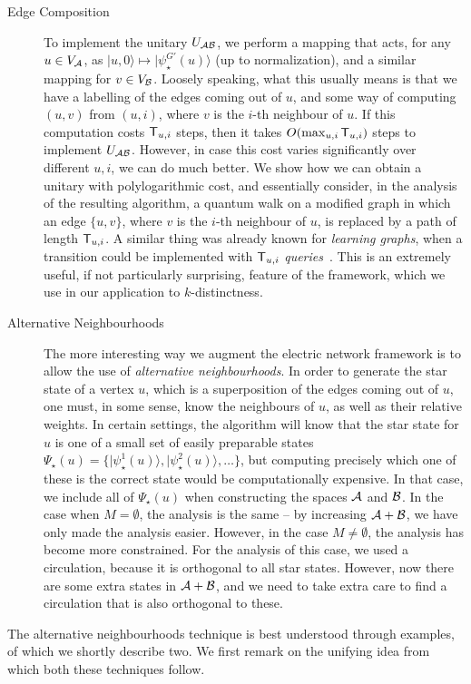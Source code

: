 \documentclass{article}
\def\ket#1{{\lvert}#1\rangle}
\renewcommand{\>}{\rangle}
\newcommand{\<}{\langle}
\renewcommand{\(}{\left(}
\renewcommand{\)}{\right)}
\begin{document}
\begin{description}
\item[Edge Composition] To implement the unitary $U_{\cal AB}$, we perform a mapping that acts, for any $u\in V_{\cal A}$, as $\ket{u,0}\mapsto \ket{\psi_\star^{G'}(u)}$ (up to normalization), and a similar mapping for $v\in V_{\cal B}$. Loosely speaking, what this usually means is that we have a labelling of the edges coming out of $u$, and some way of computing $(u,v)$ from $(u,i)$, where $v$ is the $i$-th neighbour of $u$. If this computation costs ${\sf T}_{u,i}$ steps, then it takes $O(\max_{u,i}{\sf T}_{u,i})$ steps to implement $U_{\cal AB}$. However, in case this cost varies significantly over different $u,i$, we can do much better. We show how we can obtain a unitary with polylogarithmic cost, and essentially consider, in the analysis of the resulting algorithm, a quantum walk on a modified graph in which an edge $\{u,v\}$, where $v$ is the $i$-th neighbour of $u$, is replaced by a path of length ${\sf T}_{u,i}$.  A similar thing was already known for \emph{learning graphs}, when a transition could be implemented with ${\sf T}_{u,i}$ \emph{queries}~\cite{belovs2012LG}. This is an extremely useful, if not particularly surprising, feature of the framework, which we use in our application to $k$-distinctness. 
\item[Alternative Neighbourhoods] The more interesting way we augment the electric network framework is to allow the use of \emph{alternative neighbourhoods}. In order to generate the star state of a vertex $u$, which is a superposition of the edges coming out of $u$, one must, in some sense, know the neighbours of $u$, as well as their relative weights. In certain settings, the algorithm will know that the star state for $u$ is one of a small set of easily preparable states $\Psi_\star(u)=\{\ket{\psi_\star^1(u)},\ket{\psi^2_\star(u)},\dots\}$, but computing precisely which one of these is the correct state would be computationally expensive. In that case, we include all of $\Psi_\star(u)$ when constructing the spaces ${\cal A}$ and ${\cal B}$. In the case when $M=\emptyset$, the analysis is the same -- by increasing ${\cal A}+{\cal B}$, we have only made the analysis easier. However, in the case $M\neq \emptyset$, the analysis has become more constrained. For the analysis of this case, we used a circulation, because it is orthogonal to all star states. However, now there are some extra states in ${\cal A}+{\cal B}$, and we need to take extra care to find a circulation that is also orthogonal to these. 
\end{description}
The alternative neighbourhoods technique is best understood through examples, of which we shortly describe two. We first remark on the unifying idea from which both these techniques follow. 
\end{document}
